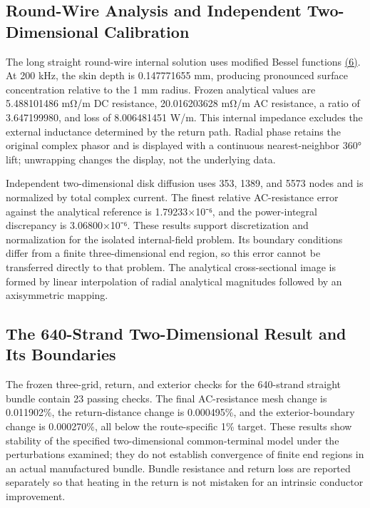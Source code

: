 \documentclass[journal,10pt]{IEEEtran}
\begin{document}
\subsection*{Round-Wire Analysis and Independent Two-Dimensional Calibration}
\hypertarget{03.analytic.heading}{}
The long straight round-wire internal solution uses modified Bessel functions \href{paper_en_ieee.pdf#E03}{(6)}. At 200 kHz, the skin depth is 0.147771655 mm, producing pronounced surface concentration relative to the 1 mm radius. Frozen analytical values are 5.488101486 mΩ/m DC resistance, 20.016203628 mΩ/m AC resistance, a ratio of 3.647199980, and loss of 8.006481451 W/m. This internal impedance excludes the external inductance determined by the return path. Radial phase retains the original complex phasor and is displayed with a continuous nearest-neighbor 360° lift; unwrapping changes the display, not the underlying data.


Independent two-dimensional disk diffusion uses 353, 1389, and 5573 nodes and is normalized by total complex current. The finest relative AC-resistance error against the analytical reference is 1.79233×10⁻⁶, and the power-integral discrepancy is 3.06800×10⁻⁶. These results support discretization and normalization for the isolated internal-field problem. Its boundary conditions differ from a finite three-dimensional end region, so this error cannot be transferred directly to that problem. The analytical cross-sectional image is formed by linear interpolation of radial analytical magnitudes followed by an axisymmetric mapping.


\subsection*{The 640-Strand Two-Dimensional Result and Its Boundaries}
\hypertarget{03.coax_results.heading}{}
The frozen three-grid, return, and exterior checks for the 640-strand straight bundle contain 23 passing checks. The final AC-resistance mesh change is 0.011902\%, the return-distance change is 0.000495\%, and the exterior-boundary change is 0.000270\%, all below the route-specific 1\% target. These results show stability of the specified two-dimensional common-terminal model under the perturbations examined; they do not establish convergence of finite end regions in an actual manufactured bundle. Bundle resistance and return loss are reported separately so that heating in the return is not mistaken for an intrinsic conductor improvement.
\end{document}
